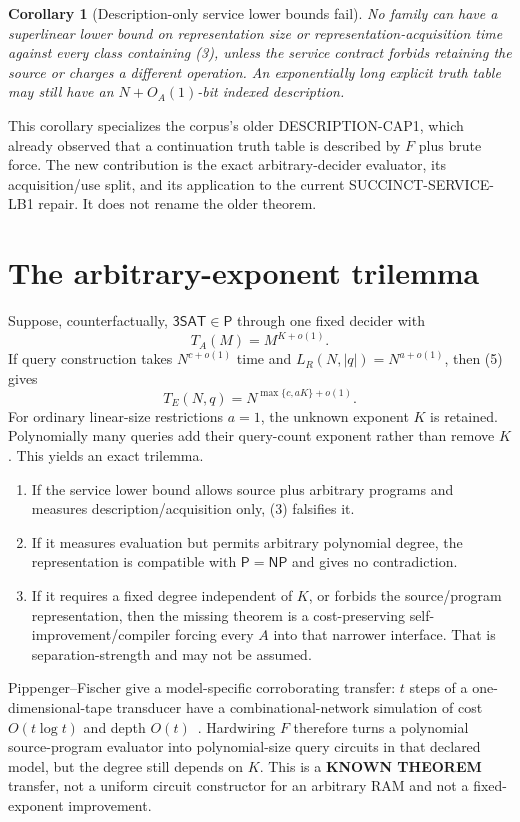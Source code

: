\documentclass[11pt]{article}
\newtheorem{corollary}[theorem]{Corollary}
\newcommand{\SAT}{\mathsf{3SAT}}
\newcommand{\Pclass}{\mathsf P}
\newcommand{\NPclass}{\mathsf{NP}}
\newcommand{\status}[1]{\textbf{#1}}
\begin{document}
\begin{corollary}[Description-only service lower bounds fail]
No family can have a superlinear lower bound on representation size or
representation-acquisition time against every class containing (3), unless
the service contract forbids retaining the source or charges a different
operation.  An exponentially long explicit truth table may still have an
$N+O_A(1)$-bit indexed description.
\end{corollary}

This corollary specializes the corpus's older \textsf{DESCRIPTION-CAP1},
which already observed that a continuation truth table is described by $F$
plus brute force.  The new contribution is the exact arbitrary-decider
evaluator, its acquisition/use split, and its application to the current
\textsf{SUCCINCT-SERVICE-LB1} repair.  It does not rename the older theorem.

\section{The arbitrary-exponent trilemma}
Suppose, counterfactually, $\SAT\in\Pclass$ through one fixed decider with
\[
 T_A(M)=M^{K+o(1)}.
\]
If query construction takes $N^{c+o(1)}$ time and
$L_R(N,|q|)=N^{a+o(1)}$, then (5) gives
\[
 T_E(N,q)=N^{\max\{c,aK\}+o(1)}.                           \tag{6}
\]
For ordinary linear-size restrictions $a=1$, the unknown exponent $K$ is
retained.  Polynomially many queries add their query-count exponent rather
than remove $K$.  This yields an exact trilemma.
\begin{enumerate}[leftmargin=2em]
\item If the service lower bound allows source plus arbitrary programs and
measures description/acquisition only, (3) falsifies it.
\item If it measures evaluation but permits arbitrary polynomial degree,
the representation is compatible with $\Pclass=\NPclass$ and gives no
contradiction.
\item If it requires a fixed degree independent of $K$, or forbids the
source/program representation, then the missing theorem is a cost-preserving
self-improvement/compiler forcing every $A$ into that narrower interface.
That is separation-strength and may not be assumed.
\end{enumerate}

Pippenger--Fischer give a model-specific corroborating transfer: $t$ steps
of a one-dimensional-tape transducer have a combinational-network simulation
of cost $O(t\log t)$ and depth $O(t)$~\cite{pf}.  Hardwiring $F$ therefore
turns a polynomial source-program evaluator into polynomial-size query
circuits in that declared model, but the degree still depends on $K$.
This is a \status{KNOWN THEOREM} transfer, not a uniform circuit constructor
for an arbitrary RAM and not a fixed-exponent improvement.
\end{document}
